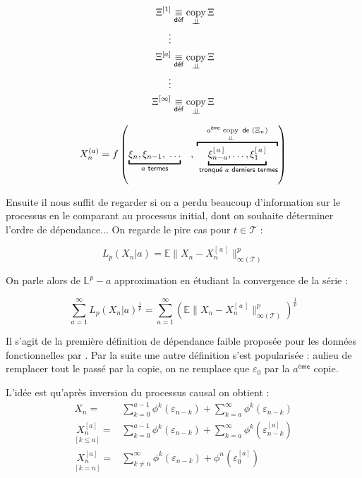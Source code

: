 \begin{minipage}{0.45\textwidth}

\begin{align*}
    \Xi^{[1]} &\isdef \operatornamewithlimits{copy}\limits_{\indep} \Xi
    \\
    \vdots &  
    \\
\Xi^{[a]} &\isdef \operatornamewithlimits{copy}\limits_{\indep} \Xi
\\ \vdots &   
\\
\Xi^{[\infty]} &\isdef \operatornamewithlimits{copy}\limits_{\indep} \Xi
\end{align*}

\end{minipage}
%
\begin{minipage}{0.45\textwidth}
$$X_n^{(a)} = f\left( 
\underbracket{    
\xi_n, \xi_{n-1}, \; \dots}_
{a \textsf{ termes}} 
\quad , \, 
\overbracket
{\underbracket{\xi_{n-a}^{[\, a \, ]} , \dots , \xi_{1}^{[ \, a \, ]}}_
{\textsf{ tronqué } a \textsf{ derniers termes}}
}^{a^{\textsf{ème}} \, \operatornamewithlimits{copy}\limits_{\indep} \textsf{ de } (\Xi_n)}
\right)$$
\end{minipage}

\bigskip

Ensuite il nous suffit de regarder si on a perdu beaucoup d'information sur le processus en le comparant au processus initial, dont on souhaite déterminer l'ordre de dépendance... On regarde le pire cas pour $t \in \mathcal T$ :

$$L_p(X_n | a ) = {\mathds E  \lVert {X_n} - {X_n^{[\, a \, ]}} } \rVert_{\infty(\mathcal T)} ^p$$

On parle alors de $\mathds L^p-a$ approximation en étudiant la convergence de la série :

$$\sum\limits_{a=1}^\infty L_p(X_n | a )^{\frac 1 p} = \sum\limits_{a=1}^\infty \left({\mathds E  \lVert {X_n} - {X_n^{[\, a \, ]}} } \rVert_{\infty(\mathcal T)} ^p\right)^{\frac 1 p}$$



Il s'agit de la première définition de dépendance faible proposée pour les données fonctionnelles par . Par la suite une autre définition s'est popularisée : aulieu de remplacer tout le passé par la copie, on ne remplace que $\varepsilon_0$ par la $a^{\textsf{ème}}$ copie.

L'idée est qu'après inversion du processus causal on obtient :
\begin{align*}
    X_n = &\sum\limits_{k=0}^{a-1} \phi^k( \varepsilon_{n-k}) + \sum\limits_{k=a}^{\infty} \phi^k( \varepsilon_{n-k})
    \\
    \underset {[k\leq a]} {X_n^{[a]}} = &\sum\limits_{k=0}^{a-1} \phi^k( \varepsilon_{n-k}) + \sum\limits_{k=a}^{\infty} \phi^k( \varepsilon_{n-k}^{[a]})
    \\
    \underset {[k = n]} {X_n^{[a]}} = &\sum\limits_{k \neq n}^{\infty} \phi^k( \varepsilon_{n-k}) + \phi^n( \varepsilon_{0}^{[a]})
\end{align*}

